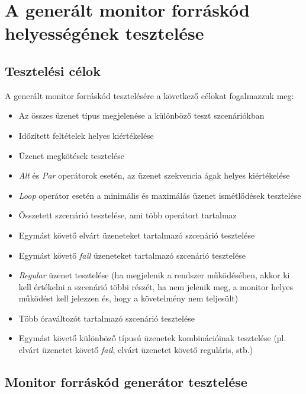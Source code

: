 \chapter{A generált monitor forráskód helyességének tesztelése}

\section{Tesztelési célok}

A generált monitor forráskód tesztelésére a következő célokat fogalmazzuk meg:

\begin{itemize}
    \item Az összes üzenet típus megjelenése a különböző teszt szcenáriókban
    \item Időzített feltételek helyes kiértékelése
    \item Üzenet megkötések tesztelése
    \item \textit{Alt} és \textit{Par} operátorok esetén, az üzenet szekvencia ágak helyes kiértékelése
    \item \textit{Loop} operátor esetén a minimális és maximálás üzenet ismétlődések tesztelése
    \item Összetett szcenárió tesztelése, ami több operátort tartalmaz
    \item Egymást követő elvárt üzeneteket tartalmazó szcenárió tesztelése
    \item Egymást követő \textit{fail} üzeneteket tartalmazó szcenárió tesztelése
    \item \textit{Regular} üzenet tesztelése (ha megjelenik a rendszer működésében, akkor ki kell értékelni a szcenárió többi részét, ha nem jelenik meg, a monitor helyes működést kell jelezzen és, hogy a követelmény nem teljesült)
    \item Több óraváltozót tartalmazó szcenárió tesztelése
    \item Egymást követő különböző típusú üzenetek kombinációinak tesztelése (pl. elvárt üzenetet követő \textit{fail}, elvárt üzenetet követő reguláris, stb.)
\end{itemize}

\clearpage\section{Monitor forráskód generátor tesztelése}


